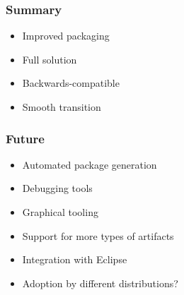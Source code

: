 \documentclass[pdftex,unicode,xcolor=table]{beamer}
\begin{document}
\begin{frame}
  \frametitle{Summary}
  \begin{itemize}
    \item Improved packaging
    \item Full solution
    \item Backwards-compatible
    \item Smooth transition
  \end{itemize}
\end{frame}


\begin{frame}
  \frametitle{Future}
  \begin{itemize}
    \item Automated package generation
    \item Debugging tools
    \item Graphical tooling
    \item Support for more types of artifacts
    \item Integration with Eclipse
    \item Adoption by different distributions?
  \end{itemize}
\end{frame}



 {
  \Rhbg{\frame{\theend}}
}
\end{document}
